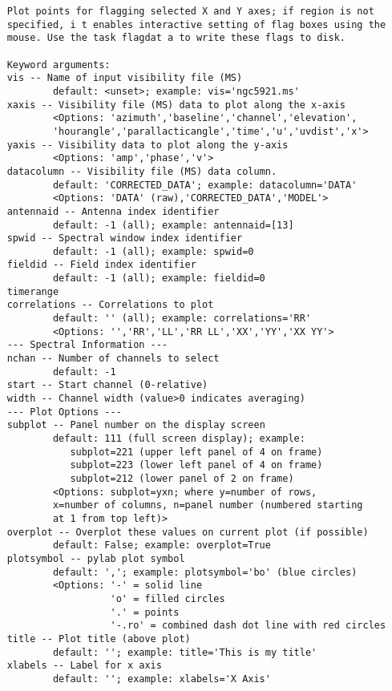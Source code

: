 \small
\begin{verbatim}
    Plot points for flagging selected X and Y axes; if region is not
    specified, i t enables interactive setting of flag boxes using the
    mouse. Use the task flagdat a to write these flags to disk.
    
    Keyword arguments:
    vis -- Name of input visibility file (MS)
            default: <unset>; example: vis='ngc5921.ms'
    xaxis -- Visibility file (MS) data to plot along the x-axis
            <Options: 'azimuth','baseline','channel','elevation',
            'hourangle','parallacticangle','time','u','uvdist','x'>
    yaxis -- Visibility data to plot along the y-axis
            <Options: 'amp','phase','v'>
    datacolumn -- Visibility file (MS) data column.
            default: 'CORRECTED_DATA'; example: datacolumn='DATA'
            <Options: 'DATA' (raw),'CORRECTED_DATA','MODEL'>
    antennaid -- Antenna index identifier
            default: -1 (all); example: antennaid=[13]
    spwid -- Spectral window index identifier
            default: -1 (all); example: spwid=0
    fieldid -- Field index identifier
            default: -1 (all); example: fieldid=0
    timerange
    correlations -- Correlations to plot
            default: '' (all); example: correlations='RR'
            <Options: '','RR','LL','RR LL','XX','YY','XX YY'>
    --- Spectral Information ---
    nchan -- Number of channels to select
            default: -1
    start -- Start channel (0-relative)
    width -- Channel width (value>0 indicates averaging)
    --- Plot Options ---
    subplot -- Panel number on the display screen
            default: 111 (full screen display); example:
               subplot=221 (upper left panel of 4 on frame)
               subplot=223 (lower left panel of 4 on frame)
               subplot=212 (lower panel of 2 on frame)
            <Options: subplot=yxn; where y=number of rows,
            x=number of columns, n=panel number (numbered starting
            at 1 from top left)>
    overplot -- Overplot these values on current plot (if possible)
            default: False; example: overplot=True
    plotsymbol -- pylab plot symbol
            default: ','; example: plotsymbol='bo' (blue circles)
            <Options: '-' = solid line
                      'o' = filled circles
                      '.' = points
                      '-.ro' = combined dash dot line with red circles
    title -- Plot title (above plot)
            default: ''; example: title='This is my title'
    xlabels -- Label for x axis
            default: ''; example: xlabels='X Axis'

\end{verbatim}

